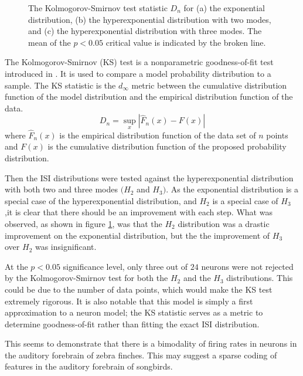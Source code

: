 \begin{figure}

\caption{\label{exphehe3} The Kolmogorov-Smirnov test statistic $D_n$ for (a) the exponential distribution, (b) the hyperexponential distribution with two modes, and (c) the hyperexponential distribution with three modes.  The mean of the $p<0.05$ critical value is indicated by the broken line.}
\end{figure}

The Kolmogorov-Smirnov (KS) test is a nonparametric goodness-of-fit test introduced in \cite{Massey1951a}.  It is used to compare a model probability distribution to a sample.  The KS statistic is the $d_{\infty}$ metric between the cumulative distribution function of the model distribution and the empirical distribution function of the data.
\begin{equation}
D_n = \sup_x \left| \hat{F}_n(x) - F(x) \right|
\end{equation}
where $\hat{F}_n(x)$ is the empirical distribution function of the data set of $n$ points and $F(x)$ is the cumulative distribution function of the proposed probability distribution.

Then the ISI distributions were tested against the hyperexponential distribution with both two and three modes $(H_2$ and $H_3)$.  As the exponential distribution is a special case of the hyperexponential distribution, and $H_2$ is a special case of $H_3$ ,it is clear that there should be an improvement with each step.  What was observed, as shown in figure \ref{exphehe3}, was that the $H_2$ distribution was a drastic improvement on the exponential distribution, but the the improvement of $H_3$ over $H_2$ was insignificant. 



At the $p<0.05$ significance level, only three out of $24$ neurons were not rejected by the Kolmogorov-Smirnov test for both the $H_2$ and the $H_3$ distributions. This could be due to the number of data points, which would make the KS test extremely rigorous.  It is also notable that this model is simply a first approximation to a neuron model; the KS statistic serves as a metric to determine goodness-of-fit rather than fitting the exact ISI distribution.

This seems to demonstrate that there is a bimodality of firing rates in neurons in the auditory forebrain of zebra finches.  This may suggest a sparse coding of features in the auditory forebrain of songbirds.  

